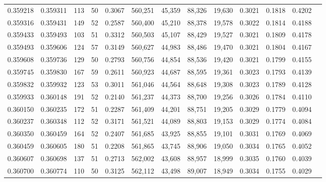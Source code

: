 \begin{tabular}{rrrrrrrrrrrrr}
0.359218 & 0.359311 &   113 &  50 &                                     0.3067 & 560,251 &  45,359 &  88,326 &  19,630 & 0.3021 & 0.1818 & 0.4202 \\
0.359316 & 0.359431 &   149 &  52 &                                     0.2587 & 560,400 &  45,210 &  88,378 &  19,578 & 0.3022 & 0.1814 & 0.4188 \\
0.359433 & 0.359493 &   103 &  51 &                                     0.3312 & 560,503 &  45,107 &  88,429 &  19,527 & 0.3021 & 0.1809 & 0.4178 \\
0.359493 & 0.359606 &   124 &  57 &                                     0.3149 & 560,627 &  44,983 &  88,486 &  19,470 & 0.3021 & 0.1804 & 0.4167 \\
0.359608 & 0.359736 &   129 &  50 &                                     0.2793 & 560,756 &  44,854 &  88,536 &  19,420 & 0.3021 & 0.1799 & 0.4155 \\
0.359745 & 0.359830 &   167 &  59 &                                     0.2611 & 560,923 &  44,687 &  88,595 &  19,361 & 0.3023 & 0.1793 & 0.4139 \\
0.359832 & 0.359932 &   123 &  53 &                                     0.3011 & 561,046 &  44,564 &  88,648 &  19,308 & 0.3023 & 0.1789 & 0.4128 \\
0.359933 & 0.360148 &   191 &  52 &                                     0.2140 & 561,237 &  44,373 &  88,700 &  19,256 & 0.3026 & 0.1784 & 0.4110 \\
0.360150 & 0.360235 &   172 &  51 &                                     0.2287 & 561,409 &  44,201 &  88,751 &  19,205 & 0.3029 & 0.1779 & 0.4094 \\
0.360237 & 0.360348 &   112 &  52 &                                     0.3171 & 561,521 &  44,089 &  88,803 &  19,153 & 0.3029 & 0.1774 & 0.4084 \\
0.360350 & 0.360459 &   164 &  52 &                                     0.2407 & 561,685 &  43,925 &  88,855 &  19,101 & 0.3031 & 0.1769 & 0.4069 \\
0.360459 & 0.360605 &   180 &  51 &                                     0.2208 & 561,865 &  43,745 &  88,906 &  19,050 & 0.3034 & 0.1765 & 0.4052 \\
0.360607 & 0.360698 &   137 &  51 &                                     0.2713 & 562,002 &  43,608 &  88,957 &  18,999 & 0.3035 & 0.1760 & 0.4039 \\
0.360700 & 0.360774 &   110 &  50 &                                     0.3125 & 562,112 &  43,498 &  89,007 &  18,949 & 0.3034 & 0.1755 & 0.4029 \\

\end{tabular}
